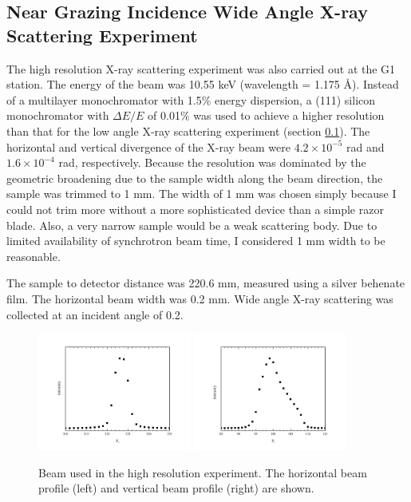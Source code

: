 \subsection{Near Grazing Incidence Wide Angle X-ray Scattering Experiment}
The high resolution X-ray scattering experiment was also carried out at 
the G1 station.
The energy of the beam was 10.55 keV (wavelength = 1.175 \AA).
Instead of a multilayer monochromator with 1.5\% energy dispersion, a (111)
silicon monochromator with $\Delta E/E$ of 0.01\% was used to achieve
a higher resolution than that for the low angle X-ray scattering experiment
(section \ref{}).
The horizontal and vertical divergence of the X-ray beam were
$4.2 \times 10^{-5}$ rad and $1.6 \times 10^{-4}$ rad, respectively. 
Because the resolution was dominated by the geometric broadening due to the
sample width along the beam direction, the sample was trimmed to 1 mm.
The width of 1 mm was chosen simply because I could not trim more
without a more sophisticated device than a simple razor blade. Also, a very
narrow sample would be a weak scattering body. Due to limited availability
of synchrotron beam time, I considered 1 mm width to be reasonable.

The sample to detector distance was 220.6 mm, measured using a silver behenate film. 
The horizontal beam width was 0.2 mm. Wide angle X-ray
scattering was collected at an incident angle of 0.2\textdegree. 

\begin{figure}
  \centering
  \includegraphics[width=0.45\textwidth]{figures/ripple/beamx_hr}
  \includegraphics[width=0.45\textwidth]{figures/ripple/beamz_hr}
  \caption{Beam used in the high resolution experiment.
  The horizontal beam profile (left) and vertical beam profile (right)
  are shown.}
  \label{fig:NGIWAXS_beam}
\end{figure}

